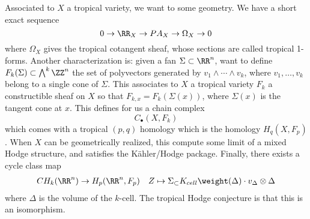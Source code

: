 


Associated to $X$ a tropical variety, we want to some geometry. We have a short exact sequence 
\[ 0 \to \RR_X\to PA_X\to \Omega_X\to 0\]
where $\Omega_X$ gives the tropical cotangent sheaf, whose sections are called tropical 1-forms. Another characterization is: given a fan $\Sigma\subset \RR^n$, want to define $F_k(\Sigma)\subset \bigwedge^k\ZZ^n$ the set of polyvectors generated by $v_1\wedge \cdots \wedge v_k$, where $v_1, \ldots, v_k$ belong to a single cone of $\Sigma$. This associates to $X$ a tropical variety $F_k$ a constructible sheaf on $X$ so that $F_{k, x}=F_k(\Sigma(x))$, where $\Sigma(x)$ is the tangent cone at $x$. This defines for us a chain complex 
\[C_\bullet(X, F_k)\]
which comes with a tropical $(p, q)$ homology which is the homology $H_q(X, F_p)$.  When $X$ can be geometrically realized, this compute some limit of a mixed Hodge structure, and satisfies the K\"ahler/Hodge package. Finally, there exists a cycle class map 
\begin{align*}
    CH_k(\RR^n)\to H_{p}(\RR^n, F_p)&&
    Z\mapsto \Sigma_\subset K_{cell} \weight(\Delta)\cdot v_\Delta \otimes \Delta
\end{align*}
where $\Delta$ is the volume of the $k$-cell. The tropical Hodge conjecture is that this is an isomorphism. 
